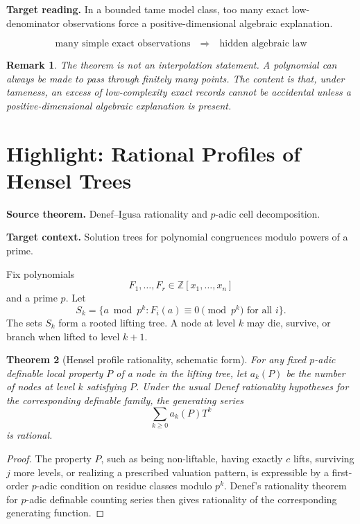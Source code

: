 \documentclass[11pt]{article}
\newtheorem{theorem}{Theorem}[section]
\newtheorem{remark}[theorem]{Remark}
\begin{document}
\textbf{Target reading.}
In a bounded tame model class, too many exact low-denominator observations force a positive-dimensional algebraic explanation.

\[
\boxed{
\text{many simple exact observations}
\quad\Longrightarrow\quad
\text{hidden algebraic law}
}
\]

\begin{remark}
The theorem is not an interpolation statement. A polynomial can always be made to pass through finitely many points. The content is that, under tameness, an excess of low-complexity exact records cannot be accidental unless a positive-dimensional algebraic explanation is present.
\end{remark}

\section{Highlight: Rational Profiles of Hensel Trees}

\textbf{Source theorem.}
Denef--Igusa rationality and \(p\)-adic cell decomposition.

\textbf{Target context.}
Solution trees for polynomial congruences modulo powers of a prime.

Fix polynomials
\[
F_1,\ldots,F_r\in\mathbb Z[x_1,\ldots,x_n]
\]
and a prime \(p\). Let
\[
S_k=\{a\bmod p^k:F_i(a)\equiv0\pmod {p^k}\text{ for all }i\}.
\]
The sets \(S_k\) form a rooted lifting tree. A node at level \(k\) may die, survive, or branch when lifted to level \(k+1\).

\begin{theorem}[Hensel profile rationality, schematic form]
For any fixed \(p\)-adic definable local property \(P\) of a node in the lifting tree, let \(a_k(P)\) be the number of nodes at level \(k\) satisfying \(P\). Under the usual Denef rationality hypotheses for the corresponding definable family, the generating series
\[
\sum_{k\geq0}a_k(P)T^k
\]
is rational.
\end{theorem}

\begin{proof}
The property \(P\), such as being non-liftable, having exactly \(c\) lifts, surviving \(j\) more levels, or realizing a prescribed valuation pattern, is expressible by a first-order \(p\)-adic condition on residue classes modulo \(p^k\). Denef's rationality theorem for \(p\)-adic definable counting series then gives rationality of the corresponding generating function.
\end{proof}
\end{document}
